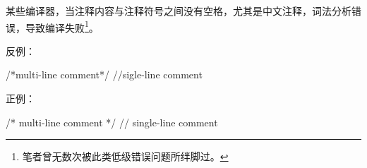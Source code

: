 \begin{content}
某些编译器，当注释内容与注释符号之间没有空格，尤其是中文注释，词法分析错误，导致编译失败\footnote{笔者曾无数次被此类低级错误问题所绊脚过。}。

反例：
\begin{leftbar}
\begin{c++}
/*multi-line comment*/
//sigle-line comment
\end{c++}
\end{leftbar}

正例：
\begin{leftbar}
\begin{c++}
/* multi-line comment */
// single-line comment
\end{c++}
\end{leftbar}

\end{content}
